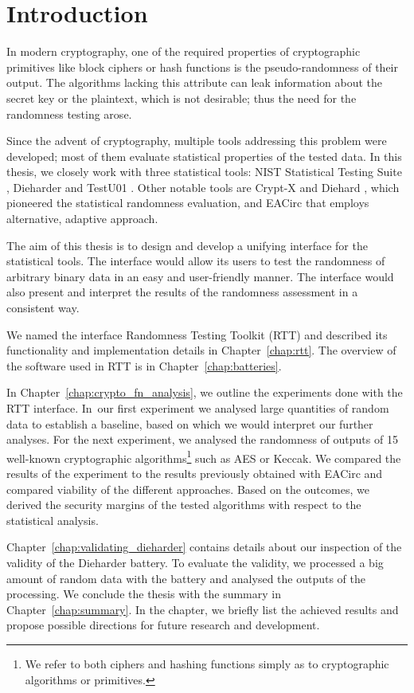 \documentclass[
	digital,    %
	oneside,    %
	color,
	11pt,
	nocover,
	notable,
	nolof,
	nolot,
]{fithesis3}
\theoremstyle{definition}
\theoremstyle{remark}
\begin{document}
\chapter{Introduction}
In modern cryptography, one of the required properties of cryptographic primitives like block ciphers or hash functions is the pseudo-randomness of their output. The algorithms lacking this attribute can leak information about the secret key or the plaintext, which is not desirable; thus the need for the randomness testing arose.

Since the advent of cryptography, multiple tools addressing this problem were developed; most of them evaluate statistical properties of the tested data. In this thesis, we closely work with three statistical tools: NIST Statistical Testing Suite \cite{nist-sts}, Dieharder \cite{dieharder} and TestU01 \cite{testu01-paper}. Other notable tools are Crypt-X \cite{crypt-x} and Diehard \cite{diehard}, which pioneered the statistical randomness evaluation, and EACirc \cite{eacirc-github} that employs alternative, adaptive approach.

The aim of this thesis is to design and develop a unifying interface for the statistical tools. The interface would allow its users to test the randomness of arbitrary binary data in an easy and user-friendly manner. The interface would also present and interpret the results of the randomness assessment in a consistent way. 

We named the interface Randomness Testing Toolkit (RTT) \cite{rtt-github} and described its functionality and implementation details in Chapter~\ref{chap:rtt}. The overview of the software used in RTT is in Chapter~\ref{chap:batteries}. 

In Chapter~\ref{chap:crypto_fn_analysis}, we outline the experiments done with the RTT interface. In~our first experiment we analysed large quantities of random data to establish a baseline, based on which we would interpret our further analyses. For the next experiment, we analysed the randomness of outputs of 15 well-known cryptographic algorithms\footnote{We refer to both ciphers and hashing functions simply as to cryptographic algorithms or primitives.} such as AES or Keccak. We compared the results of the experiment to the results previously obtained with EACirc and compared viability of the different approaches. Based on the outcomes, we derived the security margins of the tested algorithms with respect to the statistical analysis.

Chapter~\ref{chap:validating_dieharder} contains details about our inspection of the validity of the Dieharder battery. To evaluate the validity, we processed a big amount of random data with the battery and analysed the outputs of the processing. We conclude the thesis with the summary in Chapter~\ref{chap:summary}. In the chapter, we briefly list the achieved results and propose possible directions for future research and development.
\end{document}
